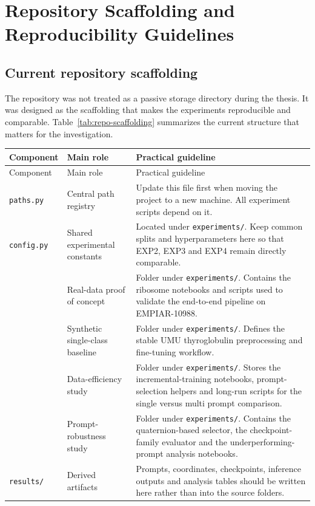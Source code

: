 \documentclass[12pt,a4paper]{report}
\begin{document}
\chapter{Repository Scaffolding and Reproducibility Guidelines}

\section{Current repository scaffolding}
The repository was not treated as a passive storage directory during the thesis. It was designed as the scaffolding that makes the experiments reproducible and comparable. Table~\ref{tab:repo-scaffolding} summarizes the current structure that matters for the investigation.

\footnotesize
\begin{longtable}{P{0.22\textwidth}P{0.26\textwidth}P{0.42\textwidth}}
  \toprule
  Component & Main role & Practical guideline \\
  \midrule
  \endfirsthead
  \toprule
  Component & Main role & Practical guideline \\
  \midrule
  \endhead
  \texttt{paths.py} & Central path registry & Update this file first when moving the project to a new machine. All experiment scripts depend on it. \\
  \texttt{config.py} & Shared experimental constants & Located under \texttt{experiments/}. Keep common splits and hyperparameters here so that EXP2, EXP3 and EXP4 remain directly comparable. \\
   & Real-data proof of concept & Folder under \texttt{experiments/}. Contains the ribosome notebooks and scripts used to validate the end-to-end pipeline on EMPIAR-10988. \\
   & Synthetic single-class baseline & Folder under \texttt{experiments/}. Defines the stable UMU thyroglobulin preprocessing and fine-tuning workflow. \\
   & Data-efficiency study & Folder under \texttt{experiments/}. Stores the incremental-training notebooks, prompt-selection helpers and long-run scripts for the single versus multi prompt comparison. \\
   & Prompt-robustness study & Folder under \texttt{experiments/}. Contains the quaternion-based selector, the checkpoint-family evaluator and the underperforming-prompt analysis notebooks. \\
  \texttt{results/} & Derived artifacts & Prompts, coordinates, checkpoints, inference outputs and analysis tables should be written here rather than into the source folders. \\

\end{longtable}
\end{document}
